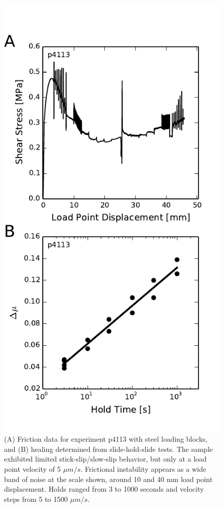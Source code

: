 \begin{figure}
\begin{center}
\includegraphics{chap_granular_stiffness/Fig7.pdf}
\caption{\label{fig:healing_p4113}
(A) Friction data for experiment p4113 with steel loading blocks, and (B) healing determined from slide-hold-slide tests. The sample exhibited limited stick-slip/slow-slip behavior, but only at a load point velocity of 5 $\mu m/s$.  Frictional instability appears as a wide band of noise at the scale shown, around 10 and 40 mm load point displacement. Holds ranged from 3 to 1000 seconds and velocity steps from 5 to 1500 $\mu m/s$.}
\end{center}
\end{figure}




